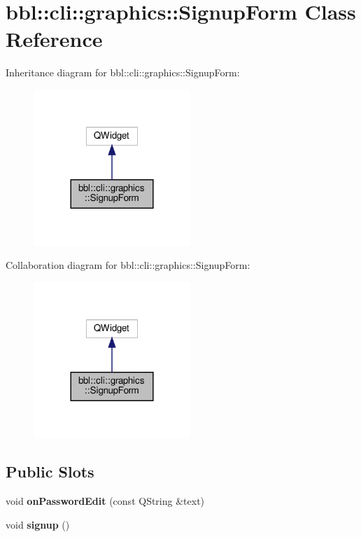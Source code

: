 \hypertarget{classbbl_1_1cli_1_1graphics_1_1_signup_form}{}\section{bbl\+:\+:cli\+:\+:graphics\+:\+:Signup\+Form Class Reference}
\label{classbbl_1_1cli_1_1graphics_1_1_signup_form}


Inheritance diagram for bbl\+:\+:cli\+:\+:graphics\+:\+:Signup\+Form\+:
\nopagebreak
\begin{figure}[H]
\begin{center}
\leavevmode
\includegraphics[width=168pt]{classbbl_1_1cli_1_1graphics_1_1_signup_form__inherit__graph}
\end{center}
\end{figure}


Collaboration diagram for bbl\+:\+:cli\+:\+:graphics\+:\+:Signup\+Form\+:
\nopagebreak
\begin{figure}[H]
\begin{center}
\leavevmode
\includegraphics[width=168pt]{classbbl_1_1cli_1_1graphics_1_1_signup_form__coll__graph}
\end{center}
\end{figure}
\subsection*{Public Slots}
\begin{DoxyCompactItemize}
\item 
\mbox{\label{classbbl_1_1cli_1_1graphics_1_1_signup_form_a2d0783bca931ef03fb674226cd6d75f4}} 
void {\bfseries on\+Password\+Edit} (const Q\+String \&text)
\item 
\mbox{\label{classbbl_1_1cli_1_1graphics_1_1_signup_form_ae72c45e319409cf769210569d1de064a}} 
void {\bfseries signup} ()
\end{DoxyCompactItemize}
